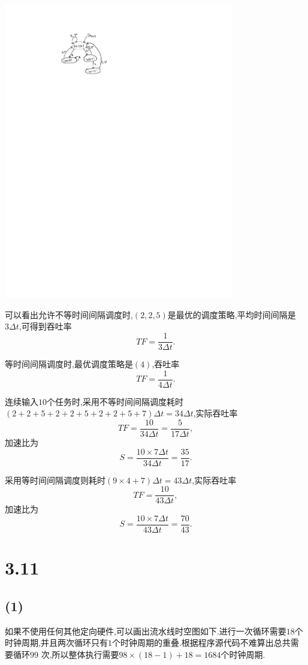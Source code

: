 \documentclass[adobefonts, nocap]{ctexart}
\begin{document}
    \begin{center}
      \includegraphics[width=10cm]{3-crop.pdf}
    \end{center}

    可以看出允许不等时间间隔调度时,$(2,2,5)$是最优的调度策略,平均时间间隔是$3\Delta t$,可得到吞吐率
    \[
      TF=\frac{1}{3\Delta t}.
    \]

    等时间间隔调度时,最优调度策略是$(4)$,吞吐率
    \[
      TF=\frac{1}{4\Delta t}.
    \]

    连续输入$10$个任务时,采用不等时间间隔调度耗时$(2+2+5+2+2+5+2+2+5+7)\Delta t=34\Delta t$,实际吞吐率
    \[
      TF=\frac{10}{34\Delta t}=\frac{5}{17\Delta t},
    \]
    加速比为
    \[
      S=\frac{10\times 7\Delta t}{34\Delta t}=\frac{35}{17}.
    \]

    采用等时间间隔调度则耗时$(9\times 4+7)\Delta t=43\Delta t$,实际吞吐率
    \[
      TF=\frac{10}{43\Delta t},
    \]
    加速比为
    \[
      S=\frac{10\times 7\Delta t}{43\Delta t}=\frac{70}{43}.
    \]
  \section*{3.11}
    \subsection*{(1)}
      如果不使用任何其他定向硬件,可以画出流水线时空图如下.进行一次循环需要$18$个时钟周期,并且两次循环只有$1$个时钟周期的重叠.根据程序源代码不难算出总共需要循环$99$
      次,所以整体执行需要$98\times (18-1)+18=1684$个时钟周期.
\end{document}
